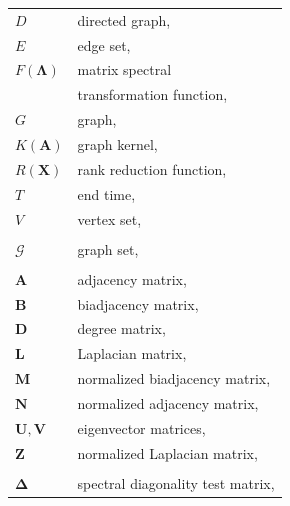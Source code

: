 \documentclass[11pt,a4paper]{book}
\begin{document}
{  \begin{minipage}[t]{.5\linewidth}
    \vspace{0pt}
    \begin{tabular}{ll}
      $D$ & directed graph, \pageref{sec:graph-theory} \\
      $E$ & edge set, \pageref{sec:graph-theory} \\
      $F(\mathbf \Lambda)$ & matrix spectral \\
      & \;\; transformation function,
      \pageref{sec:spectral-evolution-model:definition} \\ 
      $G$ & graph, \pageref{sec:graph-theory} \\
      $K(\mathbf A)$ & graph kernel,
      \pageref{sec:spectral-evolution-model:explanations:graph-kernels}
      \\ 
      $R(\mathbf X)$ & rank reduction function,
      \pageref{sec:rank-reduction} \\ 
      $T$ & end time, \pageref{sec:spectral-evolution-model:verification} \\
      $V$ & vertex set, \pageref{sec:graph-theory} \\
      \\
      $\mathcal G$ & graph set, \pageref{sec:network-collection:overview} \\
      \\
      $\mathbf A$ & adjacency matrix, \pageref{eq:adjacency-matrix} \\
      $\mathbf B$ & biadjacency matrix, \pageref{eq:biadjacency-matrix} \\
      $\mathbf D$ & degree matrix, \pageref{eq:degree-matrix} \\
      $\mathbf L$ & Laplacian matrix, \pageref{eq:laplacian-matrix} \\
      $\mathbf M$ & normalized biadjacency matrix,
      \pageref{eq:normalized-biadjacency-matrix} \\ 
      $\mathbf N$ & normalized adjacency matrix,
      \pageref{eq:normalized-adjacency-matrix} \\ 
      $\mathbf U, \mathbf V$ & eigenvector matrices,
      \pageref{para:eigenvalue-decomposition} \\ 
      $\mathbf Z$ & normalized Laplacian matrix,
      \pageref{eq:normalized-laplacian-matrix} \\ 
      \\
      $\mathbf \Delta$ & spectral diagonality test
      matrix, \pageref{eq:diagonality} \\ 

\end{tabular}
\end{minipage}}
\end{document}
